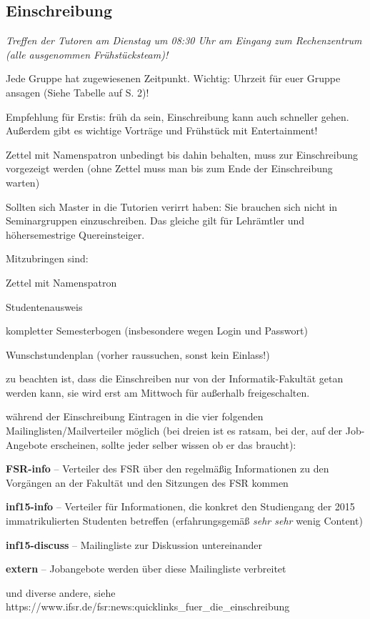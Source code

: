 \documentclass[a4paper,12pt]{report}
\begin{document}
\subsection{Einschreibung}
\begin{itemize*}
	\item \textit{Treffen der Tutoren am Dienstag um 08:30 Uhr am Eingang zum Rechenzentrum (alle ausgenommen Frühstücksteam)!}
	\item Jede Gruppe hat zugewiesenen Zeitpunkt. Wichtig: Uhrzeit für euer Gruppe ansagen (Siehe Tabelle auf S. 2)!
	\item Empfehlung für Erstis: früh da sein, Einschreibung kann auch schneller gehen. Außerdem gibt es wichtige Vorträge und Frühstück mit Entertainment!
	\item Zettel mit Namenspatron unbedingt bis dahin behalten, muss zur Einschreibung vorgezeigt werden (ohne Zettel muss man bis zum Ende der Einschreibung warten)
	\item Sollten sich Master in die Tutorien verirrt haben:
	Sie brauchen sich nicht in Seminargruppen einzuschreiben.
	Das gleiche gilt für Lehrämtler und höhersemestrige Quereinsteiger.
	\item Mitzubringen sind:
		\begin{itemize*}
		\item Zettel mit Namenspatron
		\item Studentenausweis
		\item kompletter Semesterbogen (insbesondere wegen Login und Passwort)
		\item Wunschstundenplan (vorher raussuchen, sonst kein Einlass!)
		\item zu beachten ist, dass die Einschreiben nur von der Informatik-Fakultät getan werden kann, sie wird erst am Mittwoch für außerhalb freigeschalten.
	\end{itemize*}
	\item während der Einschreibung Eintragen in die vier folgenden Mailinglisten/Mailverteiler möglich (bei dreien ist es ratsam, bei der, auf der Job-Angebote erscheinen, sollte jeder selber wissen ob er das braucht):
		\begin{itemize*}
		\item \textbf{FSR-info} -- Verteiler des FSR über den regelmäßig Informationen zu den Vorgängen an der Fakultät und den Sitzungen des FSR kommen
		\item \textbf{inf15-info} -- Verteiler für Informationen, die konkret den Studiengang der 2015 immatrikulierten Studenten betreffen (erfahrungsgemäß \textit{sehr sehr} wenig Content)
		\item \textbf{inf15-discuss} -- Mailingliste zur Diskussion untereinander
		\item \textbf{extern} -- Jobangebote werden über diese Mailingliste verbreitet
		\item und diverse andere, siehe \\ https://www.ifsr.de/fsr:news:quicklinks\_fuer\_die\_einschreibung
	\end{itemize*}
\end{itemize*}
\end{document}
